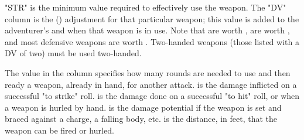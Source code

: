 \begin{multicols}{2}
"STR" is the minimum \STR value required to effectively use the weapon. The "DV" column is the  (\DV) adjustment for that particular weapon; this value is added to the adventurer's \CDV and \GDV when that weapon is in use. Note that  are worth ,  are worth , and most defensive weapons are worth . Two-handed weapons (those listed with a DV of two) must be used two-handed.

The value in the  column specifies how many rounds are needed to use and then ready a weapon, already in hand, for another attack.  is the damage inflicted on a successful "to strike" roll.  is the damage done on a successful "to hit" roll, or when a weapon is hurled by hand.  is the damage potential if the weapon is set and braced against a charge, a falling body, etc.  is the distance, in feet, that the weapon can be fired or hurled.
\end{multicols}
\label{playing-weapon-table}


